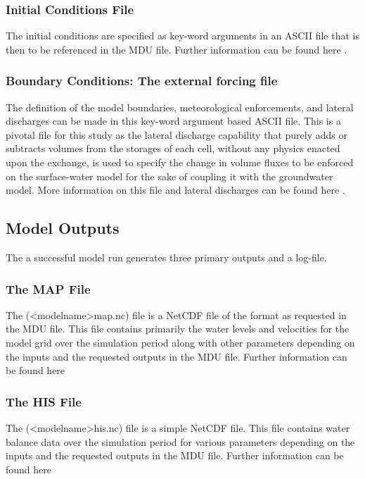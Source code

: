 \subsubsection*{Initial Conditions File}
The initial conditions are specified as key-word arguments in an ASCII file that is then to be referenced in the MDU file. Further information can be found here \cite[p.~414]{Deltares2016}.

\subsubsection*{Boundary Conditions: The external forcing file}
The definition of the model boundaries, meteorological enforcements, and lateral discharges can be made in this key-word argument based ASCII file. This is a pivotal file for this study as the lateral discharge capability that purely adds or subtracts volumes from the storages of each cell, without any physics enacted upon the exchange, is used to specify the change in volume fluxes to be enforced on the surface-water model for the sake of coupling it with the groundwater model. More information on this file and lateral discharges can be found here \cite[p.~407]{Deltares2016}.


\subsection{Model Outputs}
The a successful model run generates three primary outputs and a log-file.

\subsubsection*{The MAP File}
The (\textless model\textunderscore name\textgreater \textunderscore map.nc) file is a NetCDF file of the format as requested in the MDU file. This file contains primarily the water levels and velocities for the model grid over the simulation period along with other parameters depending on the inputs and the requested outputs in the MDU file. Further information can be found here \cite[p.~472]{Deltares2016}

\subsubsection*{The HIS File}
The (\textless model\textunderscore name\textgreater \textunderscore his.nc) file is a simple NetCDF file. This file contains water balance data over the simulation period for various parameters depending on the inputs and the requested outputs in the MDU file. Further information can be found here \cite[p.~472]{Deltares2016}

